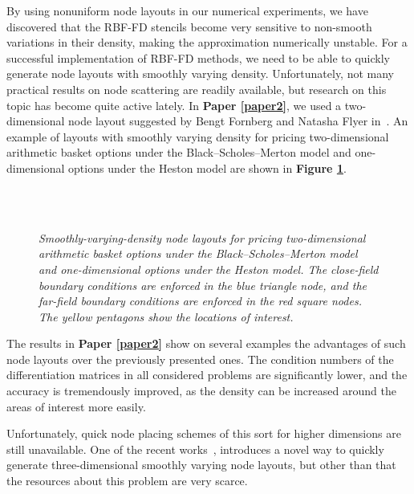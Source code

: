 \documentclass{UUThesisTemplate}
\begin{document}
\par
By using nonuniform node layouts in our numerical experiments, we have discovered that the RBF-FD stencils become very sensitive to non-smooth variations in their density, making the approximation numerically unstable. %
For a successful implementation of RBF-FD methods, we need to be able to quickly generate node layouts with smoothly varying density. Unfortunately, not many practical results on node scattering are readily available, but research on this topic has become quite active lately. In \textbf{Paper \ref{paper2}}, we used a two-dimensional node layout suggested by Bengt Fornberg and Natasha Flyer in~\cite{fornberg2015fast}. An example of layouts with smoothly varying density for pricing two-dimensional arithmetic basket options under the Black--Scholes--Merton model and one-dimensional options under the Heston model are shown in \textbf{Figure \ref{fig:gridsmooth}}.
\begin{figure}[H]
\centering
\\
\vspace{11pt}
\\
\caption{\emph{Smoothly-varying-density node layouts for pricing two-dimensional arithmetic basket options under the Black--Scholes--Merton model and one-dimensional options under the Heston model. The close-field boundary conditions are enforced in the blue triangle node, and the far-field boundary conditions are enforced in the red square nodes. The yellow pentagons show the locations of interest.}}
\label{fig:gridsmooth}
\end{figure}

\par
The results in \textbf{Paper \ref{paper2}} show on several examples the advantages of such node layouts over the previously presented ones. The condition numbers of the differentiation matrices in all considered problems are significantly lower, and the accuracy is tremendously improved, as the density can be increased around the areas of interest more easily. 
\par
Unfortunately, quick node placing schemes of this sort for higher dimensions are still unavailable. One of the recent works~\cite{vlasiuk2017fast}, introduces a novel way to quickly generate three-dimensional smoothly varying node layouts, but other than that the resources about this problem are very scarce.
%
\end{document}
